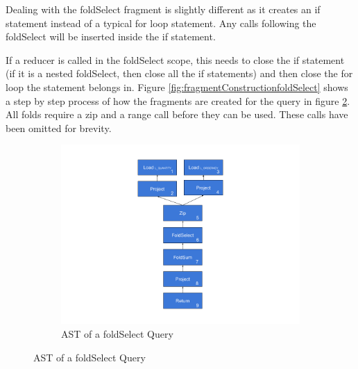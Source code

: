 Dealing with the foldSelect fragment is slightly different as it creates an if statement instead of a typical for loop statement. Any calls following the foldSelect will be inserted inside the if statement. 

If a reducer is called in the foldSelect scope, this needs to close the if statement (if it is a nested foldSelect, then close all the if statements) and then close the for loop the statement belongs in. Figure \ref{fig:fragmentConstructionfoldSelect} shows a step by step process of how the fragments are created for the query in figure \ref{fig:ASTfoldSelect}. All folds require a zip and a range call before they can be used. These calls have been omitted for brevity.

\begin{figure}
\centering
\begin{subfigure}{0.9\textwidth}
  \centering
  \includegraphics[width=1\linewidth]{appendix/foldSelectQuery.png}
  \caption{AST of a foldSelect Query}
  \label{fig:ASTfoldSelect}
\end{subfigure}%


\end{figure}
